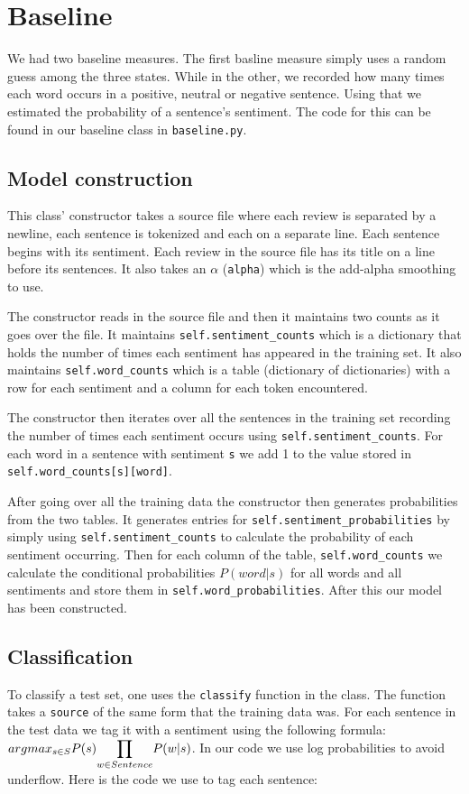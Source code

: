 \documentclass{article}
\begin{document}
\section{Baseline}
We had two baseline measures. The first basline measure simply uses a random guess among the three states. While in the other, we recorded how many times each word occurs in a positive, neutral or negative sentence. Using that we estimated the probability of a sentence's sentiment. The code for this can be found in our baseline class in \texttt{baseline.py}.


\subsection{Model construction}
This class' constructor takes a source file where each review is separated by a newline, each sentence is tokenized and each on a separate line. Each sentence begins with its sentiment. Each review in the source file has its title on a line before its sentences. It also takes an $\alpha$ (\texttt{alpha}) which is the add-alpha smoothing to use.

The constructor reads in the source file and then it maintains two counts as it goes over the file. It maintains \texttt{self.sentiment\_counts} which is a dictionary that holds the number of times each sentiment has appeared in the training set. It also maintains \texttt{self.word\_counts} which is a table (dictionary of dictionaries) with a row for each sentiment and a column for each token encountered.

The constructor then iterates over all the sentences in the training set recording the number of times each sentiment occurs using \texttt{self.sentiment\_counts}. For each word in a sentence with sentiment \texttt{s} we add 1 to the value stored in \texttt{self.word\_counts[s][word]}.

After going over all the training data the constructor then generates probabilities from the two tables. It generates entries for \texttt{self.sentiment\_probabilities} by simply using \texttt{self.sentiment\_counts} to calculate the probability of each sentiment occurring. Then for each column of the table, \texttt{self.word\_counts} we calculate the conditional probabilities $P(word|s)$ for all words and all sentiments and store them in \texttt{self.word\_probabilities}. After this our model has been constructed.


\subsection{Classification}
To classify a test set, one uses the \texttt{classify} function in the class. The function takes a \texttt{source} of the same form that the training data was. For each sentence in the test data we tag it with a sentiment using the following formula: $argmax_{s\in S}P(s)\mathlarger{\prod}_{w\in Sentence} P(w|s)$. In our code we use log probabilities to avoid underflow. Here is the code we use to tag each sentence:
\end{document}
